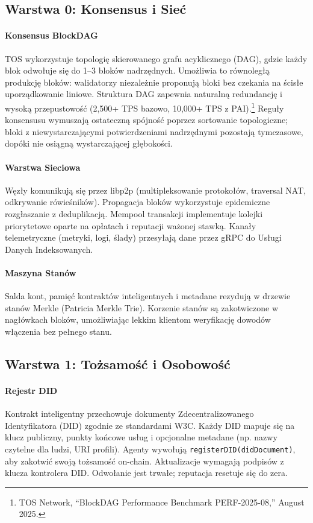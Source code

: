 \documentclass[11pt]{article}
\begin{document}
\subsection{Warstwa 0: Konsensus i Sieć}
\paragraph{Konsensus BlockDAG} TOS wykorzystuje topologię skierowanego grafu acyklicznego (DAG), gdzie każdy blok odwołuje się do 1--3 bloków nadrzędnych. Umożliwia to równoległą produkcję bloków: walidatorzy niezależnie proponują bloki bez czekania na ścisłe uporządkowanie liniowe. Struktura DAG zapewnia naturalną redundancję i wysoką przepustowość (2,500+ TPS bazowo, 10,000+ TPS z PAI).\footnote{TOS Network, ``BlockDAG Performance Benchmark PERF-2025-08,'' August 2025.} Reguły konsensusu wymuszają ostateczną spójność poprzez sortowanie topologiczne; bloki z niewystarczającymi potwierdzeniami nadrzędnymi pozostają tymczasowe, dopóki nie osiągną wystarczającej głębokości.

\paragraph{Warstwa Sieciowa} Węzły komunikują się przez libp2p (multipleksowanie protokołów, traversal NAT, odkrywanie rówieśników). Propagacja bloków wykorzystuje epidemiczne rozgłaszanie z deduplikacją. Mempool transakcji implementuje kolejki priorytetowe oparte na opłatach i reputacji ważonej stawką. Kanały telemetryczne (metryki, logi, ślady) przesyłają dane przez gRPC do Usługi Danych Indeksowanych.

\paragraph{Maszyna Stanów} Salda kont, pamięć kontraktów inteligentnych i metadane rezydują w drzewie stanów Merkle (Patricia Merkle Trie). Korzenie stanów są zakotwiczone w nagłówkach bloków, umożliwiając lekkim klientom weryfikację dowodów włączenia bez pełnego stanu.

\subsection{Warstwa 1: Tożsamość i Osobowość}
\paragraph{Rejestr DID} Kontrakt inteligentny przechowuje dokumenty Zdecentralizowanego Identyfikatora (DID) zgodnie ze standardami W3C. Każdy DID mapuje się na klucz publiczny, punkty końcowe usług i opcjonalne metadane (np. nazwy czytelne dla ludzi, URI profili). Agenty wywołują \texttt{registerDID(didDocument)}, aby zakotwić swoją tożsamość on-chain. Aktualizacje wymagają podpisów z klucza kontrolera DID. Odwołanie jest trwałe; reputacja resetuje się do zera.
\end{document}
